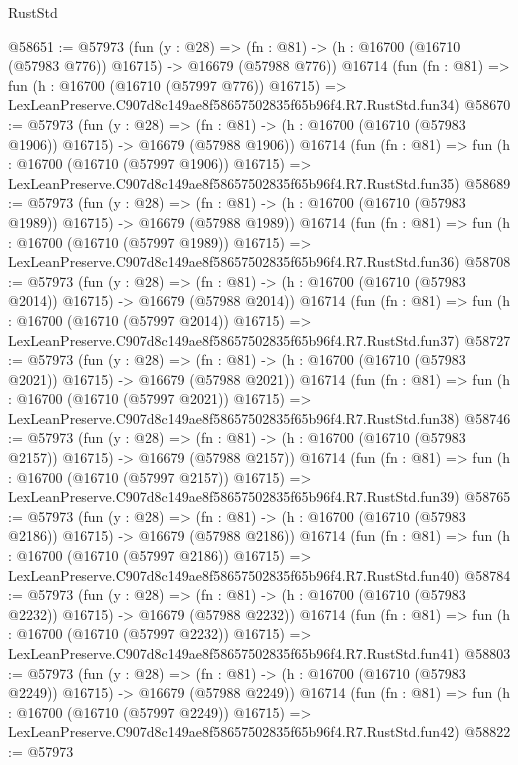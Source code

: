 \begin{lexlean}{RustStd}
\begin{coremodule}
@58651 := @57973
    (fun (y : @28) =>
    (fn : @81) -> (h : @16700 (@16710 (@57983 @776)) @16715) -> @16679 (@57988 @776))
    @16714
    (fun (fn : @81) =>
    fun (h : @16700 (@16710 (@57997 @776)) @16715) =>
    LexLeanPreserve.C907d8c149ae8f58657502835f65b96f4.R7.RustStd.fun34)
@58670 := @57973
    (fun (y : @28) =>
    (fn : @81) -> (h : @16700 (@16710 (@57983 @1906)) @16715) -> @16679 (@57988 @1906))
    @16714
    (fun (fn : @81) =>
    fun (h : @16700 (@16710 (@57997 @1906)) @16715) =>
    LexLeanPreserve.C907d8c149ae8f58657502835f65b96f4.R7.RustStd.fun35)
@58689 := @57973
    (fun (y : @28) =>
    (fn : @81) -> (h : @16700 (@16710 (@57983 @1989)) @16715) -> @16679 (@57988 @1989))
    @16714
    (fun (fn : @81) =>
    fun (h : @16700 (@16710 (@57997 @1989)) @16715) =>
    LexLeanPreserve.C907d8c149ae8f58657502835f65b96f4.R7.RustStd.fun36)
@58708 := @57973
    (fun (y : @28) =>
    (fn : @81) -> (h : @16700 (@16710 (@57983 @2014)) @16715) -> @16679 (@57988 @2014))
    @16714
    (fun (fn : @81) =>
    fun (h : @16700 (@16710 (@57997 @2014)) @16715) =>
    LexLeanPreserve.C907d8c149ae8f58657502835f65b96f4.R7.RustStd.fun37)
@58727 := @57973
    (fun (y : @28) =>
    (fn : @81) -> (h : @16700 (@16710 (@57983 @2021)) @16715) -> @16679 (@57988 @2021))
    @16714
    (fun (fn : @81) =>
    fun (h : @16700 (@16710 (@57997 @2021)) @16715) =>
    LexLeanPreserve.C907d8c149ae8f58657502835f65b96f4.R7.RustStd.fun38)
@58746 := @57973
    (fun (y : @28) =>
    (fn : @81) -> (h : @16700 (@16710 (@57983 @2157)) @16715) -> @16679 (@57988 @2157))
    @16714
    (fun (fn : @81) =>
    fun (h : @16700 (@16710 (@57997 @2157)) @16715) =>
    LexLeanPreserve.C907d8c149ae8f58657502835f65b96f4.R7.RustStd.fun39)
@58765 := @57973
    (fun (y : @28) =>
    (fn : @81) -> (h : @16700 (@16710 (@57983 @2186)) @16715) -> @16679 (@57988 @2186))
    @16714
    (fun (fn : @81) =>
    fun (h : @16700 (@16710 (@57997 @2186)) @16715) =>
    LexLeanPreserve.C907d8c149ae8f58657502835f65b96f4.R7.RustStd.fun40)
@58784 := @57973
    (fun (y : @28) =>
    (fn : @81) -> (h : @16700 (@16710 (@57983 @2232)) @16715) -> @16679 (@57988 @2232))
    @16714
    (fun (fn : @81) =>
    fun (h : @16700 (@16710 (@57997 @2232)) @16715) =>
    LexLeanPreserve.C907d8c149ae8f58657502835f65b96f4.R7.RustStd.fun41)
@58803 := @57973
    (fun (y : @28) =>
    (fn : @81) -> (h : @16700 (@16710 (@57983 @2249)) @16715) -> @16679 (@57988 @2249))
    @16714
    (fun (fn : @81) =>
    fun (h : @16700 (@16710 (@57997 @2249)) @16715) =>
    LexLeanPreserve.C907d8c149ae8f58657502835f65b96f4.R7.RustStd.fun42)
@58822 := @57973

\end{coremodule}
\end{lexlean}
